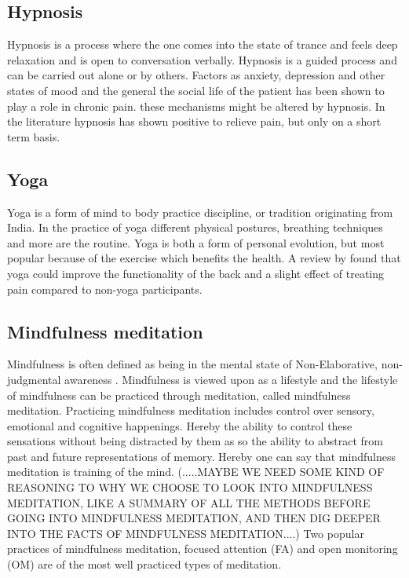\subsection{Hypnosis}
Hypnosis is a process where the one comes into the state of trance and feels deep relaxation and is open to conversation verbally. Hypnosis is a guided process and can be carried out alone or by others. \cite{Gerald2013} Factors as anxiety, depression and other states of mood and the general the social life of the patient has been shown to play a role in chronic pain. these mechanisms might be altered by hypnosis.
In the literature hypnosis has shown positive to relieve pain, but only on a short term basis. \cite{Dhanani2011}

\subsection{Yoga}
Yoga is a form of mind to body practice discipline, or tradition originating from India. In the practice of yoga different physical postures, breathing techniques and more are the routine. 
Yoga is both a form of personal evolution, but most popular because of the exercise which benefits the health.
A review by \cite{Whitehead2017} found that yoga could improve the functionality of the back and a slight effect of treating pain compared to non-yoga participants. 

\subsection{Mindfulness meditation}
Mindfulness is often defined as being in the mental state of Non-Elaborative, non-judgmental awareness \cite{Zeidan2012,Zeidan2016,Tang2017}. 
Mindfulness is viewed upon as a lifestyle and the lifestyle of mindfulness can be practiced through meditation, called mindfulness meditation. Practicing mindfulness meditation includes control over sensory, emotional and cognitive happenings. Hereby the ability to control these sensations without being distracted by them as so the ability to abstract from past and future representations of memory. Hereby one can say that mindfulness meditation is training of the mind. \cite{Tang2017}
(.....MAYBE WE NEED SOME KIND OF REASONING TO WHY WE CHOOSE TO LOOK INTO MINDFULNESS MEDITATION, LIKE A SUMMARY OF ALL THE METHODS BEFORE GOING INTO MINDFULNESS MEDITATION, AND THEN DIG DEEPER INTO THE FACTS OF MINDFULNESS MEDITATION....)
Two popular practices of mindfulness meditation, focused attention (FA) and open monitoring (OM) are of the most well practiced types of meditation. \cite{Zeidan2016}

